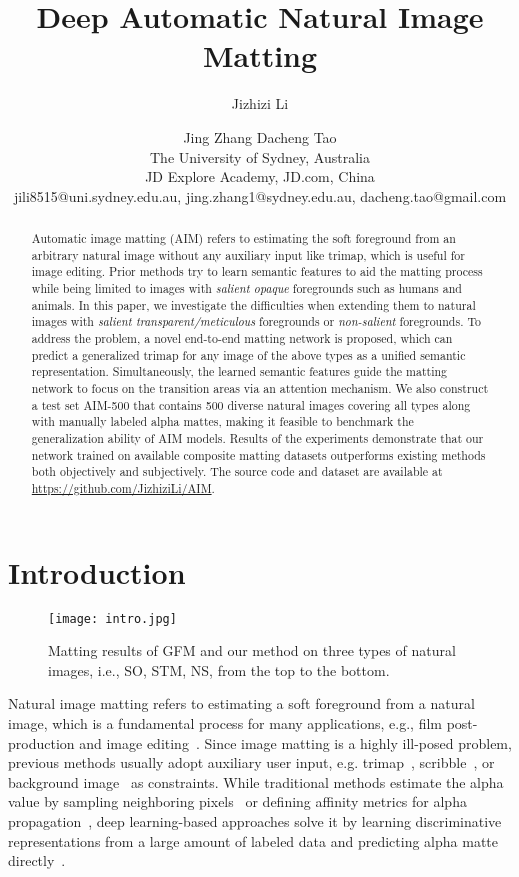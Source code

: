 \documentclass{article}
\title{Deep Automatic Natural Image Matting}
\author{
Jizhizi Li\and
Jing Zhang\And
Dacheng Tao\\
\affiliations
The University of Sydney, Australia\\
JD Explore Academy, JD.com, China\\
\emails
jili8515@uni.sydney.edu.au,
jing.zhang1@sydney.edu.au,
dacheng.tao@gmail.com
}
\begin{document}
\maketitle




\begin{abstract}
Automatic image matting (AIM) refers to estimating the soft foreground from an arbitrary natural image without any auxiliary input like trimap, which is useful for image editing. Prior methods try to learn semantic features to aid the matting process while being limited to images with \textit{salient opaque} foregrounds such as humans and animals. In this paper, we investigate the difficulties when extending them to natural images with \textit{salient transparent/meticulous} foregrounds or \textit{non-salient} foregrounds. To address the problem, a novel end-to-end matting network is proposed, which can predict a generalized trimap for any image of the above types as a unified semantic representation. Simultaneously, the learned semantic features guide the matting network to focus on the transition areas via an attention mechanism. We also construct a test set AIM-500 that contains 500 diverse natural images covering all types along with manually labeled alpha mattes, making it feasible to benchmark the generalization ability of AIM models. Results of the experiments demonstrate that our network trained on available composite matting datasets outperforms existing methods both objectively and subjectively. The source code and dataset are available at \href{https://github.com/JizhiziLi/AIM}{https://github.com/JizhiziLi/AIM}.
\end{abstract}



\section{Introduction}
\label{sec:introduction}

\begin{figure}[t]
    \texttt{[image: intro.jpg]}
    \caption{Matting results of GFM and our method on three types of natural images, i.e., SO, STM, NS, from the top to the bottom.}
    \label{fig:introduction}
\end{figure}

Natural image matting refers to estimating a soft foreground from a natural image, which is a fundamental process for many applications, e.g., film post-production and image editing~\cite{chen2013knn,zhang2020empowering}. Since image matting is a highly ill-posed problem, previous methods usually adopt auxiliary user input, e.g. trimap~\cite{sun2004poisson,cai2019disentangled}, scribble~\cite{levin2007closed}, or background image~\cite{backgroundmatting} as constraints. While traditional methods estimate the alpha value by sampling neighboring pixels~\cite{wang2007optimized} or defining affinity metrics for alpha propagation~\cite{levin2008spectral}, deep learning-based approaches solve it by learning discriminative representations from a large amount of labeled data and predicting alpha matte directly~\cite{lu2019indices,li2020natural}.
\end{document}
